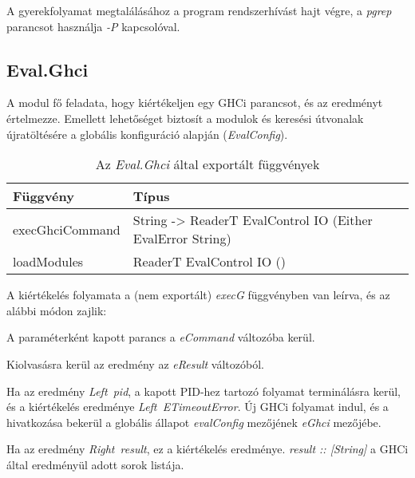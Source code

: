 A gyerekfolyamat megtalálásához a program rendszerhívást hajt végre, a \textit{pgrep} parancsot használja \textit{-P} kapcsolóval.

\subsection{Eval.Ghci}

A modul fő feladata, hogy kiértékeljen egy GHCi parancsot, és az eredményt értelmezze. Emellett lehetőséget biztosít a modulok és keresési útvonalak újratöltésére a globális konfiguráció alapján (\textit{EvalConfig}).

\begin{table}
	\centering
	\begin{tabularx}{\textwidth}{ |X|X|}
		\hline
		Függvény & Típus \\
		\hline\hline
		execGhciCommand & String -> ReaderT EvalControl IO (Either EvalError String) \\
		\hline
		loadModules & ReaderT EvalControl IO () \\
		\hline
	\end{tabularx}
	\caption[Az \textit{Eval.Ghci} által exportált függvények]{Az \textit{Eval.Ghci} által exportált függvények}
	\label{tab:interface}
\end{table}

A kiértékelés folyamata a (nem exportált) \textit{execG} függvényben van leírva, és az alábbi módon zajlik:
\begin{compactenum}
	\item A paraméterként kapott parancs a \textit{eCommand} változóba kerül.
	\item Kiolvasásra kerül az eredmény az \textit{eResult} változóból.
	\item Ha az eredmény \textit{Left\ pid}, a kapott PID-hez tartozó folyamat terminálásra kerül, és a kiértékelés eredménye \textit{Left\ ETimeoutError}. Új GHCi folyamat indul, és a hivatkozása bekerül a globális állapot \textit{evalConfig} mezőjének \textit{eGhci} mezőjébe.
	\item Ha az eredmény \textit{Right\ result}, ez a kiértékelés eredménye. \textit{result :: [String]} a GHCi által eredményül adott sorok listája.
\end{compactenum}

